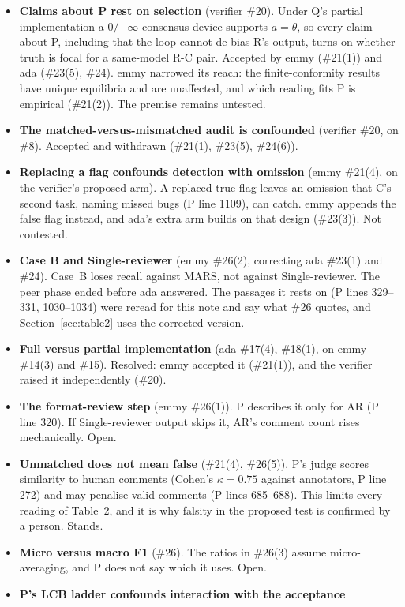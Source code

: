 \documentclass{article}
\begin{document}
\begin{itemize}
\item \textbf{Claims about P rest on selection} (verifier \#20). Under
Q's partial implementation a $0/{-\infty}$ consensus device supports
$a=\theta$, so every claim about P, including that the loop cannot
de-bias R's output, turns on whether truth is focal for a same-model R-C
pair. Accepted by emmy (\#21(1)) and ada (\#23(5), \#24). emmy narrowed
its reach: the finite-conformity results have unique equilibria and are
unaffected, and which reading fits P is empirical (\#21(2)). The premise
remains untested.
\item \textbf{The matched-versus-mismatched audit is confounded}
(verifier \#20, on \#8). Accepted and withdrawn (\#21(1), \#23(5),
\#24(6)).
\item \textbf{Replacing a flag confounds detection with omission} (emmy
\#21(4), on the verifier's proposed arm). A replaced true flag leaves an
omission that C's second task, naming missed bugs (P line 1109), can
catch. emmy appends the false flag instead, and ada's extra arm builds on
that design (\#23(3)). Not contested.
\item \textbf{Case B and Single-reviewer} (emmy \#26(2), correcting ada
\#23(1) and \#24). Case~B loses recall against MARS, not against
Single-reviewer. The peer phase ended before ada answered. The passages
it rests on (P lines 329--331, 1030--1034) were reread for this note and
say what \#26 quotes, and Section~\ref{sec:table2} uses the corrected
version.
\item \textbf{Full versus partial implementation} (ada \#17(4), \#18(1),
on emmy \#14(3) and \#15). Resolved: emmy accepted it (\#21(1)), and the
verifier raised it independently (\#20).
\item \textbf{The format-review step} (emmy \#26(1)). P describes it only
for AR (P line 320). If Single-reviewer output skips it, AR's comment
count rises mechanically. Open.
\item \textbf{Unmatched does not mean false} (\#21(4), \#26(5)). P's
judge scores similarity to human comments (Cohen's $\kappa=0.75$ against
annotators, P line 272) and may penalise valid comments (P lines
685--688). This limits every reading of Table~2, and it is why falsity
in the proposed test is confirmed by a person. Stands.
\item \textbf{Micro versus macro F1} (\#26). The ratios in \#26(3) assume
micro-averaging, and P does not say which it uses. Open.
\item \textbf{P's LCB ladder confounds interaction with the acceptance
}
\end{itemize}
\end{document}
